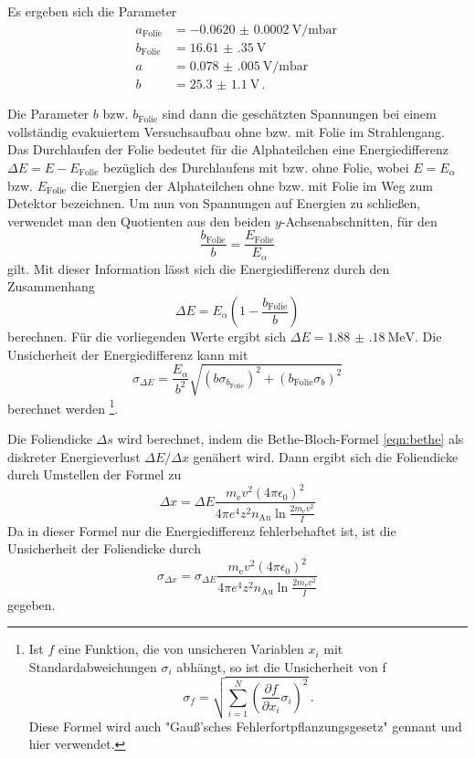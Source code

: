 Es ergeben sich die Parameter
\begin{align*}
  a_{\text{Folie}}&=\SI{-0.0620(002)}{\volt\per\milli\bar} \, \\
  b_{\text{Folie}}&=\SI{16.61(35)}{\volt} \,\\
  a&=\SI{0.078(005)}{\volt\per\milli\bar} \, \\
  b&=\SI{25.3(11)}{\volt} \,.
\end{align*}

Die Parameter $b$ bzw. $b_{\text{Folie}}$ sind dann die geschätzten Spannungen bei einem vollständig evakuiertem Versuchsaufbau ohne bzw. mit Folie im Strahlengang.
Das Durchlaufen der Folie bedeutet für die Alphateilchen eine Energiedifferenz $\Delta E = E-E_{\text{Folie}}$ bezüglich des Durchlaufens mit bzw. ohne Folie, wobei $E = E_\alpha$ bzw. $E_{\text{Folie}}$ die Energien der Alphateilchen ohne bzw. mit Folie im Weg zum Detektor bezeichnen.
Um nun von Spannungen auf Energien zu schließen, verwendet man den Quotienten aus den beiden $y$-Achsenabschnitten, für den
\begin{equation*}
  \frac{b_{\text{Folie}}}{b} = \frac{E_{\text{Folie}}}{E_\alpha}
\end{equation*}
gilt. Mit dieser Information lässt sich die Energiedifferenz durch den Zusammenhang
\begin{equation*}
  \Delta E = E_\alpha \left( 1 - \frac{b_{\text{Folie}}}{b} \right)
\end{equation*}
berechnen. Für die vorliegenden Werte ergibt sich $\Delta E = \SI{1.88(18)}{\mega\electronvolt}$.
Die Unsicherheit der Energiedifferenz kann mit
\begin{equation*}
  \sigma_{\Delta E} = \frac{E_\alpha}{b^2} \sqrt{\left( b \sigma_{b_\text{Folie}} \right)^2 + \left( b_\text{Folie} \sigma_b \right)^2}
\end{equation*}
berechnet werden \footnote{Ist $f$ eine Funktion, die von unsicheren Variablen $x_i$ mit
Standardabweichungen $\sigma_i$ abhängt, so ist die Unsicherheit von f
\begin{equation}
  \sigma_f = \sqrt{
    \sum\limits_{i = 1}^N
      \left( \frac{\partial f}{\partial x_i} \sigma_i \right)^{\!\! 2}
  }\,.
  \label{eqn:gaussfehler}
\end{equation}
Diese Formel wird auch "Gauß'sches Fehlerfortpflanzungsgesetz" gennant und hier verwendet.}.

Die Foliendicke $\Delta s$ wird berechnet, indem die Bethe-Bloch-Formel \eqref{eqn:bethe} als diskreter Energieverlust $\Delta E/\Delta x$ genähert wird.
Dann ergibt sich die Foliendicke durch Umstellen der Formel zu
\begin{equation}
  \Delta x = \Delta E
  \frac{m_{\mathrm{e}} v^2(4 \pi \epsilon_{\mathrm{0}})^2}
  {4\pi e^4 z^2 n_\text{Au} \ln{\frac{2 m_{\mathrm{e}} v^2}{I}}}
  \label{eqn:foliendicke}
\end{equation}
Da in dieser Formel nur die Energiedifferenz fehlerbehaftet ist, ist die Unsicherheit der Foliendicke durch
\begin{equation*}
  \sigma_{\Delta x} = \sigma_{\Delta E}
  \frac{m_{\mathrm{e}} v^2(4 \pi \epsilon_{\mathrm{0}})^2}
  {4\pi e^4 z^2 n_\text{Au} \ln{\frac{2 m_{\mathrm{e}} v^2}{I}}}
\end{equation*}
gegeben.

